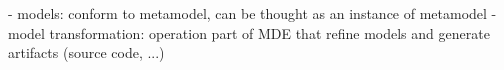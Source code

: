 

- models: conform to metamodel, can be thought as an instance of metamodel
- model transformation: operation part of MDE that refine models and generate artifacts (source code, ...)


